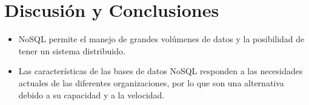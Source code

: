 \documentclass[%
 reprint,
 amsmath,amssymb,
 aps,
]{revtex4-1}
\begin{document}
\section{Discusión y Conclusiones}\label{sec:5}

	\begin{itemize}
		\item NoSQL permite el manejo de grandes volúmenes de datos y la posibilidad de tener un sistema distribuido.
		\item Las características de las bases de datos NoSQL responden a las necesidades actuales de las diferentes organizaciones, por lo que son una alternativa debido a su capacidad y a la velocidad.

	\end{itemize}





\end{document}
